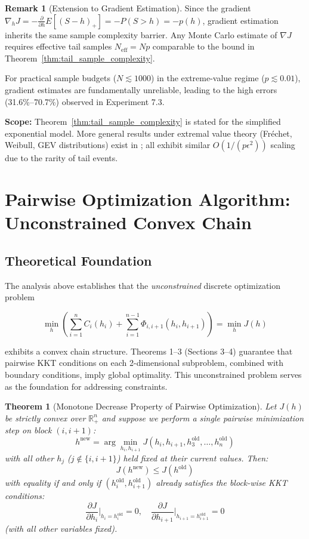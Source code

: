 \documentclass[12pt]{article}
\newtheorem{theorem}{Theorem}[section]
\theoremstyle{definition}
\newtheorem{remark}{Remark}[section]
\begin{document}
\begin{remark}[Extension to Gradient Estimation]
Since the gradient $\nabla_h J = -\frac{\partial}{\partial h} E[(S - h)_+] = -P(S > h) = -p(h)$, gradient estimation inherits the same sample complexity barrier. Any Monte Carlo estimate of $\nabla J$ requires effective tail samples $N_{\text{eff}} = Np$ comparable to the bound in Theorem~\ref{thm:tail_sample_complexity}.

For practical sample budgets ($N \lesssim 1000$) in the extreme-value regime ($p \lesssim 0.01$), gradient estimates are fundamentally unreliable, leading to the high errors (31.6\%--70.7\%) observed in Experiment 7.3.

\noindent\textbf{Scope:} Theorem~\ref{thm:tail_sample_complexity} is stated for the simplified exponential model. More general results under extremal value theory (Fréchet, Weibull, GEV distributions) exist in \cite{DeHaan:ExtremeValue}; all exhibit similar $O(1/(p\epsilon^2))$ scaling due to the rarity of tail events.
\end{remark}

\section{Pairwise Optimization Algorithm: Unconstrained Convex Chain}

\subsection*{Theoretical Foundation}

The analysis above establishes that the \emph{unconstrained} discrete optimization problem

\[
\min_h \left( \sum_{i=1}^n C_i(h_i) + \sum_{i=1}^{n-1} \Phi_{i,i+1}(h_i, h_{i+1}) \right) = \min_h J(h)
\]

exhibits a convex chain structure. Theorems 1–3 (Sections 3–4) guarantee that pairwise KKT conditions on each 2-dimensional subproblem, combined with boundary conditions, imply global optimality. This unconstrained problem serves as the foundation for addressing constraints.

\begin{theorem}[Monotone Decrease Property of Pairwise Optimization]
\label{thm:monotone_decrease}
Let $J(h)$ be strictly convex over $\mathbb{R}^n_+$ and suppose we perform a single pairwise minimization step on block $(i, i+1)$:
\[
h^{\text{new}} = \arg\min_{h_i, h_{i+1}} J(h_i, h_{i+1}, h_3^{\text{old}}, \ldots, h_n^{\text{old}})
\]
with all other $h_j$ ($j \notin \{i, i+1\}$) held fixed at their current values. Then:
\[
J(h^{\text{new}}) \leq J(h^{\text{old}})
\]
with equality if and only if $(h_i^{\text{old}}, h_{i+1}^{\text{old}})$ already satisfies the block-wise KKT conditions:
\[
\frac{\partial J}{\partial h_i}\bigg|_{h_i=h_i^{\text{old}}} = 0, \quad \frac{\partial J}{\partial h_{i+1}}\bigg|_{h_{i+1}=h_{i+1}^{\text{old}}} = 0
\]
(with all other variables fixed).
\end{theorem}
\end{document}
